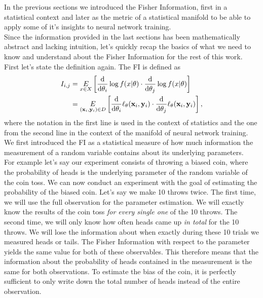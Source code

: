 In the previous sections we introduced the Fisher Information, first in a statistical context and later as the metric of a statistical manifold to be able to apply some of it's insights to neural network training.\\
Since the information provided in the last sections has been mathematically abstract and lacking intuition, let's quickly recap the basics of what we need to know and understand about the Fisher Information for the rest of this work.\\
First let's state the definition again. The FI is defined as 
\begin{equation}
	\begin{split}
		I_{i,j} &= \underset{x \in X}{E} \left[\frac{\mathrm{d}}{\mathrm{d}\theta_i}\log f(x|\theta)\cdot \frac{\mathrm{d}}{\mathrm{d}\theta_j}\log f(x|\theta)\right]\\
		&= \underset{(\mathbf{x}_i,\mathbf{y}_i)\in D}{E} \left[\frac{\mathrm{d}}{\mathrm{d}\theta_i}\ell_\theta(\mathbf{x}_i,\mathbf{y}_i)\cdot \frac{\mathrm{d}}{\mathrm{d}\theta_j}\ell_\theta(\mathbf{x}_i,\mathbf{y}_i)\right],
	\end{split}
\end{equation}
where the notation in the first line is used in the context of statistics and the one from the second line in the context of the manifold of neural network training.\\
We first introduced the FI as a statistical measure of how much information the measurement of a random variable contains about its underlying parameters.\\
For example let's say our experiment consists of throwing a biased coin, where the probability of heads is the underlying parameter of the random variable of the coin toss. We can now conduct an experiment with the goal of estimating the probability of the biased coin. Let's say we make 10 throws twice. The first time, we will use the full observation for the parameter estimation. We will exactly know the results of the coin toss \emph{for every single one} of the 10 throws. The second time, we will only know how often heads came up \emph{in total} for the 10 throws. We will lose the information about when exactly during these 10 trials we measured heads or tails. The Fisher Information with respect to the parameter yields the same value for both of these observables. This therefore means that the information about the probability of heads contained in the measurement is the same for both observations. To estimate the bias of the coin, it is perfectly sufficient to only write down the total number of heads instead of the entire observation.\\
